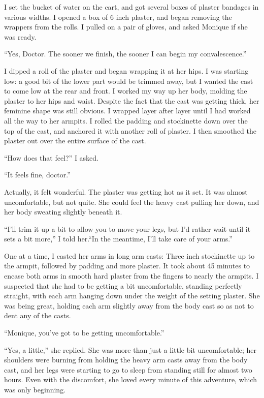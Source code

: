 I set the bucket of water on the cart, and got several boxes of plaster bandages in various
widths. I opened a box of 6 inch plaster, and began removing the wrappers from the rolls. I
pulled on a pair of gloves, and asked Monique if she was ready.

``Yes, Doctor. The sooner we finish, the sooner I can begin my convalescence.''

I dipped a roll of the plaster and began wrapping it at her hips. I was starting low: a
good bit of the lower part would be trimmed away, but I wanted the cast to come low at the rear
and front. I worked my way up her body, molding the plaster to her hips and waist. Despite the
fact that the cast was getting thick, her feminine shape was still obvious. I wrapped layer
after layer until I had worked all the way to her armpits. I rolled the padding and stockinette
down over the top of the cast, and anchored it with another roll of plaster. I then smoothed the
plaster out over the entire surface of the cast.

``How does that feel?'' I asked.

``It feels fine, doctor.''

\begin{thought}
Actually, it felt wonderful. The plaster was getting hot as it set. It was almost
uncomfortable, but not quite. She could feel the heavy cast pulling her down, and her body
sweating slightly beneath it.
\end{thought}

``I'll trim it up a bit to allow you to move your legs, but I'd rather wait until it sets a
bit more,'' I told her.``In the meantime, I'll take care of your arms.''

One at a time, I casted her arms in long arm casts: Three inch stockinette up to the
armpit, followed by padding and more plaster. It took about 45 minutes to encase both arms in
smooth hard plaster from the fingers to nearly the armpits. I suspected that she had to be
getting a bit uncomfortable, standing perfectly straight, with each arm hanging down under the
weight of the setting plaster. She was being great, holding each arm slightly away from the body
cast so as not to dent any of the casts.

``Monique, you've got to be getting uncomfortable.''

\begin{thought}
``Yes, a little,'' she replied. She was more than just a little bit uncomfortable; her
shoulders were burning from holding the heavy arm casts away from the body cast, and her legs
were starting to go to sleep from standing still for almost two hours. Even with the discomfort,
she loved every minute of this adventure, which was only beginning.
\end{thought}

